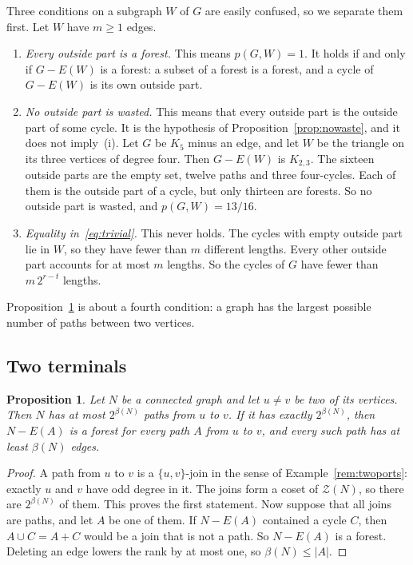 \documentclass[11pt]{article}
\newtheorem{proposition}[theorem]{Proposition}
\theoremstyle{definition}
\theoremstyle{remark}
\newcommand{\Z}{\mathcal{Z}}
\numberwithin{equation}{section}
\begin{document}
Three conditions on a subgraph $W$ of $G$ are easily confused, so we separate them first. Let $W$
have $m\ge1$ edges.
\begin{enumerate}
\item[\textup{(i)}] \emph{Every outside part is a forest.} This means $p(G,W)=1$. It holds if and
only if $G-E(W)$ is a forest: a subset of a forest is a forest, and a cycle of $G-E(W)$ is its own
outside part.
\item[\textup{(ii)}] \emph{No outside part is wasted.} This means that every outside part is the
outside part of some cycle. It is the hypothesis of Proposition~\ref{prop:nowaste}, and it does not
imply~(i). Let $G$ be $K_5$ minus an edge, and let $W$ be the triangle on its three vertices of
degree four. Then $G-E(W)$ is $K_{2,3}$. The sixteen outside parts are the empty set, twelve paths
and three four-cycles. Each of them is the outside part of a cycle, but only thirteen are forests.
So no outside part is wasted, and $p(G,W)=13/16$.
\item[\textup{(iii)}] \emph{Equality in~\eqref{eq:trivial}.} This never holds. The cycles with
empty outside part lie in $W$, so they have fewer than $m$ different lengths. Every other outside
part accounts for at most $m$ lengths. So the cycles of $G$ have fewer than $m\,2^{r-t}$ lengths.
\end{enumerate}
Proposition~\ref{prop:terminal} is about a fourth condition: a graph has the largest possible
number of paths between two vertices.

\subsection{Two terminals}

\begin{proposition}\label{prop:terminal}
Let $N$ be a connected graph and let $u\ne v$ be two of its vertices. Then $N$ has at most
$2^{\beta(N)}$ paths from $u$ to $v$. If it has exactly $2^{\beta(N)}$, then $N-E(A)$ is a forest
for every path $A$ from $u$ to $v$, and every such path has at least $\beta(N)$ edges.
\end{proposition}

\begin{proof}
A path from $u$ to $v$ is a $\{u,v\}$-join in the sense of Example~\ref{rem:twoports}: exactly $u$
and $v$ have odd degree in it. The joins form a coset of $\Z(N)$, so there are $2^{\beta(N)}$ of
them. This proves the first statement. Now suppose that all joins are paths, and let $A$ be one of
them. If $N-E(A)$ contained a cycle $C$, then $A\cup C=A+C$ would be a join that is not a path. So
$N-E(A)$ is a forest. Deleting an edge lowers the rank by at most one, so $\beta(N)\le|A|$.
\end{proof}
\end{document}
